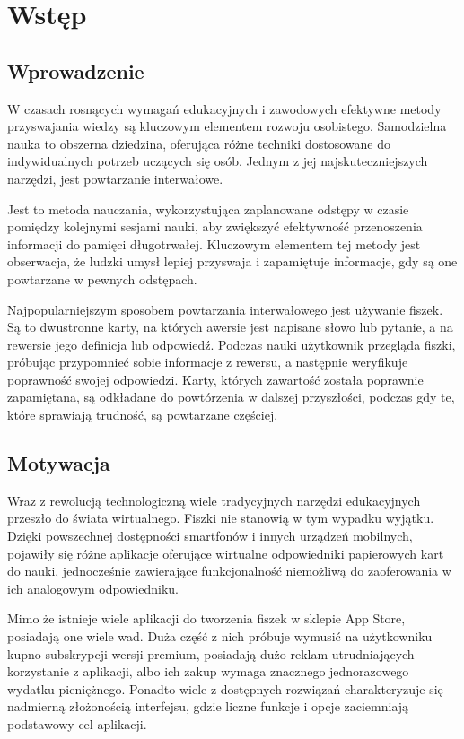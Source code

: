 \documentclass[final,a4paper,openany,12pt]{mwbk}
\begin{document}
\tableofcontents
\listoffigures  

\sloppy

\chapter*{Wstęp}

\section*{Wprowadzenie}

W czasach rosnących wymagań edukacyjnych i zawodowych efektywne metody przyswajania wiedzy są kluczowym elementem rozwoju osobistego. Samodzielna nauka to obszerna dziedzina, oferująca różne techniki dostosowane do indywidualnych potrzeb uczących się osób. Jednym z jej najskuteczniejszych narzędzi, jest powtarzanie interwałowe.

Jest to metoda nauczania, wykorzystująca zaplanowane odstępy w czasie pomiędzy kolejnymi sesjami nauki, aby zwiększyć efektywność przenoszenia informacji do pamięci długotrwałej. Kluczowym elementem tej metody jest obserwacja, że ludzki umysł lepiej przyswaja i zapamiętuje informacje, gdy są one powtarzane w pewnych odstępach.

Najpopularniejszym sposobem powtarzania interwałowego jest używanie fiszek. Są to dwustronne karty, na których awersie jest napisane słowo lub pytanie, a na rewersie jego definicja lub odpowiedź. Podczas nauki użytkownik przegląda fiszki, próbując przypomnieć sobie informacje z rewersu, a następnie weryfikuje poprawność swojej odpowiedzi. Karty, których zawartość została poprawnie zapamiętana, są odkładane do powtórzenia w dalszej przyszłości, podczas gdy te, które sprawiają trudność, są powtarzane częściej.

\section*{Motywacja}

Wraz z rewolucją technologiczną wiele tradycyjnych narzędzi edukacyjnych przeszło do świata wirtualnego. Fiszki nie stanowią w tym wypadku wyjątku. Dzięki powszechnej dostępności smartfonów i innych urządzeń mobilnych, pojawiły się różne aplikacje oferujące wirtualne odpowiedniki papierowych kart do nauki, jednocześnie zawierające funkcjonalność niemożliwą do zaoferowania w ich analogowym odpowiedniku.

Mimo że istnieje wiele aplikacji do tworzenia fiszek w sklepie App Store, posiadają one wiele wad. Duża część z nich próbuje wymusić na użytkowniku kupno subskrypcji wersji premium, posiadają dużo reklam utrudniających korzystanie z aplikacji, albo ich zakup wymaga znacznego jednorazowego wydatku pieniężnego. Ponadto wiele z dostępnych rozwiązań charakteryzuje się nadmierną złożonością interfejsu, gdzie liczne funkcje i opcje zaciemniają podstawowy cel aplikacji.
\end{document}
